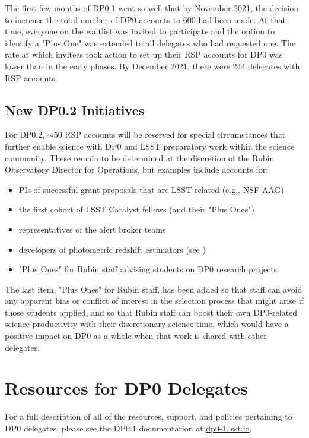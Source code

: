\documentclass[DM,lsstdraft,authoryear,toc]{lsstdoc}
\begin{document}
The first few months of DP0.1 went so well that by November 2021, the decision to increase the total number of DP0 accounts to 600 had been made.
At that time, everyone on the waitlist was invited to participate and the option to identify a "Plus One" was extended to all delegates who had requested one.
The rate at which invitees took action to set up their RSP accounts for DP0 was lower than in the early phases.
By December 2021, there were 244 delegates with RSP accounts.


\subsection{New DP0.2 Initiatives}\label{ssec:sel_dp02}

For DP0.2, $\sim$50 RSP accounts will be reserved for special circumstances that further enable science with DP0 and LSST preparatory work within the science community.
These remain to be determined at the discretion of the Rubin Observatory Director for Operations, but examples include accounts for:
\begin{itemize}
\item PIs of successful grant proposals that are LSST related (e.g., NSF AAG)
\item the first cohort of LSST Catalyst fellows (and their "Plus Ones")
\item representatives of the alert broker teams
\item developers of photometric redshift estimators (see )
\item "Plus Ones" for Rubin staff advising students on DP0 research projects
\end{itemize}

The last item, "Plus Ones" for Rubin staff, has been added so that staff can avoid any apparent bias or conflict of interest in the selection process that might arise if those students applied, and so that Rubin staff can boost their own DP0-related science productivity with their discretionary science time, which would have a positive impact on DP0 as a whole when that work is shared with other delegates.


\section{Resources for DP0 Delegates}\label{sec:res}

For a full description of all of the resources, support, and policies pertaining to DP0 delegates, please see the DP0.1 documentation at \url{dp0-1.lsst.io}.
\end{document}

